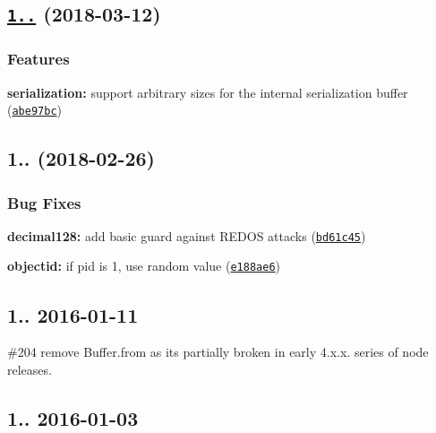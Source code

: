 \label{_1.0.6}%
 \subsection*{\href{https://github.com/mongodb/js-bson/compare/v1.0.5...v1.0.6}{\tt 1..} (2018-\/03-\/12)}

\subsubsection*{Features}


\begin{DoxyItemize}
\item {\bfseries serialization\+:} support arbitrary sizes for the internal serialization buffer (\href{https://github.com/mongodb/js-bson/commit/abe97bc}{\tt abe97bc})
\end{DoxyItemize}

\label{_1.0.5}%
 \subsection*{1.. (2018-\/02-\/26)}

\subsubsection*{Bug Fixes}


\begin{DoxyItemize}
\item {\bfseries decimal128\+:} add basic guard against R\+E\+D\+OS attacks (\href{https://github.com/mongodb/js-bson/commit/bd61c45}{\tt bd61c45})
\item {\bfseries objectid\+:} if pid is 1, use random value (\href{https://github.com/mongodb/js-bson/commit/e188ae6}{\tt e188ae6})
\end{DoxyItemize}

\subsection*{1.. 2016-\/01-\/11 }


\begin{DoxyItemize}
\item \#204 remove Buffer.\+from as it\textquotesingle{}s partially broken in early 4.\+x.\+x. series of node releases.
\end{DoxyItemize}

\subsection*{1.. 2016-\/01-\/03 }


